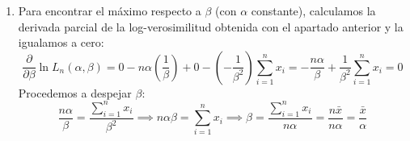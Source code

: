 \begin{enumerate}[label=\color{red}\textbf{\arabic*)}]
\begin{enumerate}[label=\color{red}\textbf{\alph*)}]
		            La función de verosimilitud se construye como el producto de las funciones de densidad evaluadas en la muestra. Para resolver el cálculo utilizamos la definición estándar de Gamma en función de sus parámetros de forma $(\alpha)$ y escala $(\beta)$: \[
			            f(x;\alpha,\beta)=\dfrac{1}{\Gamma(\alpha)\beta^\alpha}x^{\alpha-1}e^{-x / \beta}
		            \]
		            Planteamos la función de verosimilitud para la muestra: \[
			            L_n(\alpha,\beta)=\prod_{i=1}^{n} \dfrac{1}{\Gamma(\alpha)\beta^\alpha}x_i^{\alpha-1}e^{-x_i / \beta}=\dfrac{1}{(\Gamma(\alpha))^n\beta^{n\alpha}}\left( \prod_{i=1}^{n} x_i \right)^{\alpha-1}e^{-\frac{1}{\beta} \sum_{i=1}^{n} x_i}
		            \]
		            Para obtener la log-verosimilitud, aplicamos el logaritmo neperiano: \[
			            \ln L_n(\alpha,\beta)=\ln \left( (\Gamma(\alpha))^{-n} \right) +\ln(\beta^{-n\alpha})+\ln \left( \left( \prod_{i=1}^{n} x_i  \right)^{\alpha-1} \right) +\ln \left( e^{-\frac{1}{\beta} \sum_{i=1}^{n} x_i}  \right)
		            \]
		            Simplificando mediante las propiedades de los logaritmos, obtenemos la función final: \[
			            \ln L_n(\alpha,\beta)=-n \ln(\Gamma(\alpha))-n\alpha \ln(\beta)+(\alpha-1)\sum_{i=1}^{n} \ln(x_i)-\dfrac{1}{\beta}\sum_{i=1}^{n} x_i
		            \]
		      \item {}

		            Para encontrar el máximo respecto a $\beta$ (con $\alpha$ constante), calculamos la derivada parcial de la log-verosimilitud obtenida con el apartado anterior y la igualamos a cero: \[
			            \frac{\partial }{\partial \beta} \ln L_n(\alpha,\beta)=0-n\alpha \left( \dfrac{1}{\beta} \right) +0- \left( -\dfrac{1}{\beta^2} \right) \sum_{i=1}^{n} x_i=-\dfrac{n\alpha}{\beta}+\dfrac{1}{\beta^2}\sum_{i=1}^{n} x_i=0
		            \]
		            Procedemos a despejar $\beta$: \[
			            \dfrac{n\alpha}{\beta}=\dfrac{\sum_{i=1}^{n} x_i}{\beta^2}\implies n\alpha\beta=\sum_{i=1}^{n} x_i\implies \beta=\dfrac{\sum_{i=1}^{n} x_i}{n\alpha}=\dfrac{n\bar{x}}{n\alpha}=\dfrac{\bar{x}}{\alpha}
		            \]
	      \end{enumerate}
\end{enumerate}
